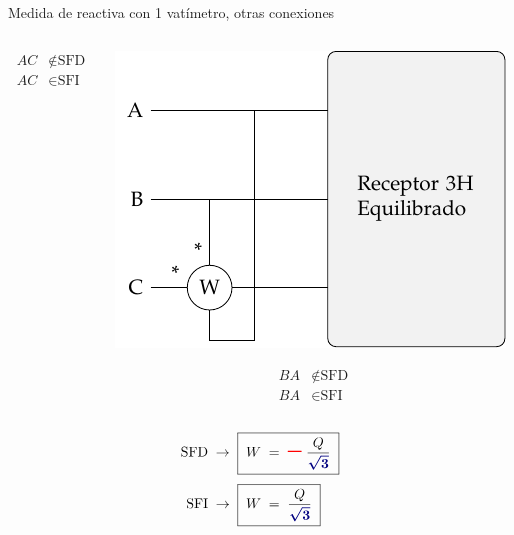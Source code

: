 \documentclass[aspectratio=169, usenames,svgnames,dvipsnames]{beamer}
\begin{document}
\begin{frame}{Medida de reactiva con 1 vatímetro, \hspace{3mm}otras conexiones}
\begin{columns}
\begin{column}{0.33\columnwidth}
        \vspace{-10mm}
        \begin{align*}
          AC &\notin \text{SFD}\\
          AC &\in \text{SFI}
        \end{align*}
    \end{column}
    \begin{column}{0.33\columnwidth}
        \begin{center}
            \includegraphics[width=.9\linewidth]{../figs/Reactiva3H_C-BA.pdf}
        \end{center}

        \vspace{-10mm}
        \begin{align*}
          BA &\notin \text{SFD}\\
          BA &\in \text{SFI}
        \end{align*}
    \end{column}
    \end{columns}
    \begin{align*}
        \text{SFD} & \;\rightarrow\; \boxed{\; W \;=\, {\Large\boldsymbol{\color{red} -}} \, \frac{Q}{\boldsymbol{\color{blue!50!black} \sqrt{3}}} \;}\\[3pt]
        \text{SFI} & \;\rightarrow\; \boxed{\; W \;=\; \frac{Q}{\boldsymbol{\color{blue!50!black} \sqrt{3}}} \;}
    \end{align*}
\end{frame}

\end{document}
